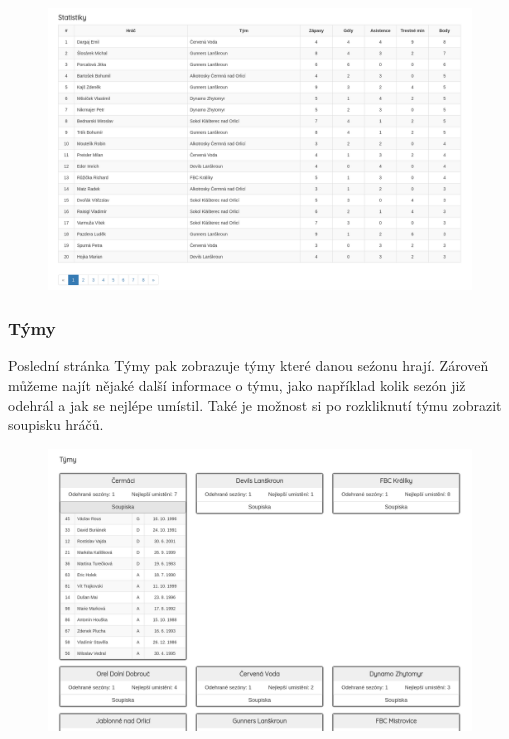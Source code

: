 \documentclass[11pt, a4paper, titlepage]{article}
\begin{document}
\begin{figure}[H]
    \centering
    \includegraphics[width=.8\textwidth]{images/statistiky.png}\hfill
\end{figure}



\subsubsection{Týmy}

Poslední stránka Týmy pak zobrazuje týmy které danou seźonu hrají. Zároveň můžeme najít nějaké další informace o týmu, jako například kolik sezón již odehrál a jak se nejlépe umístil. Také je možnost si po rozkliknutí týmu zobrazit soupisku hráčů.

\begin{figure}[H]
    \centering
    \includegraphics[width=.8\textwidth]{images/tymy.png}\hfill
\end{figure}


\newpage
\end{document}
